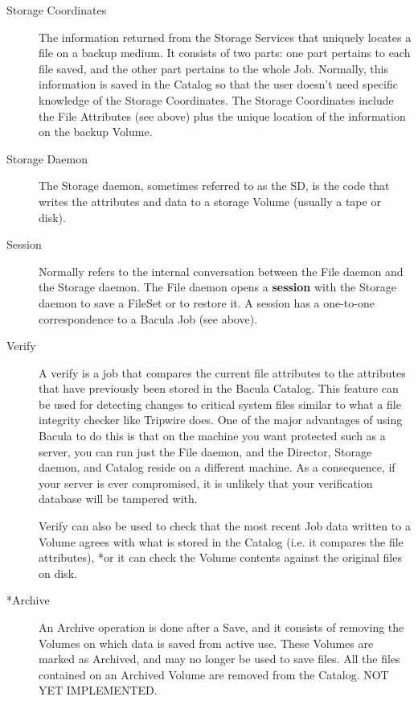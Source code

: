 \begin{description}
\item [Storage Coordinates]
   The information returned from the Storage Services that uniquely locates
   a file on a backup medium.  It consists of two parts: one part pertains
   to each file saved, and the other part pertains to the whole Job.
   Normally, this information is saved in the Catalog so that the user
   doesn't need specific knowledge of the Storage Coordinates.  The Storage
   Coordinates include the File Attributes (see above) plus the unique
   location of the information on the backup Volume.

\item [Storage Daemon]
   The Storage daemon, sometimes referred to as the SD, is the code that
   writes the attributes and data to a storage Volume (usually a tape or
   disk).

\item [Session]
   Normally refers to the internal conversation between the File daemon and
   the Storage daemon.  The File daemon opens a {\bf session} with the
   Storage daemon to save a FileSet or to restore it.  A session has a
   one-to-one correspondence to a Bacula Job (see above).

\item [Verify]
   A verify is a job that compares the current file attributes to the
   attributes that have previously been stored in the Bacula Catalog.  This
   feature can be used for detecting changes to critical system files
   similar to what a file integrity checker like Tripwire does.
   One of the major advantages of
   using Bacula to do this is that on the machine you want protected such
   as a server, you can run just the File daemon, and the Director, Storage
   daemon, and Catalog reside on a different machine.  As a consequence, if
   your server is ever compromised, it is unlikely that your verification
   database will be tampered with.

   Verify can also be used to check that the most recent Job data written
   to a Volume agrees with what is stored in the Catalog (i.e.  it compares
   the file attributes), *or it can check the Volume contents against the
   original files on disk.

\item [*Archive]
   An Archive operation is done after a Save, and it  consists of removing the
   Volumes on which data is saved from active  use. These Volumes are marked as
   Archived, and may no longer be  used to save files. All the files contained
   on an Archived Volume  are removed from the Catalog. NOT YET IMPLEMENTED. 


\end{description}
